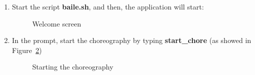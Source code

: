 \documentclass{article}	%
\begin{document}
\begin{enumerate}
 \item Start the script \textbf{baile.sh}, and then, the application will start:

  \begin{figure}[htbp]
  \centering
  \setlength\fboxrule{1.0pt}
  \caption{Welcome screen}
  \label{welcome-screen}
  \end{figure}

  \item  In the prompt, start the choreography by typing \textbf{start\_chore} (as showed in Figure~\ref{chore})
  
  \begin{figure}[htbp]
  \centering
  \setlength\fboxrule{1.0pt}
  \caption{Starting the choreography}
  \label{chore}
  \end{figure}


\end{enumerate}
\end{document}
